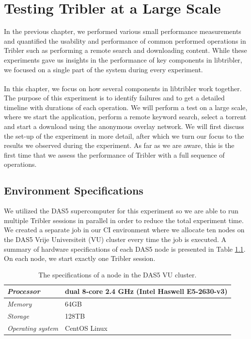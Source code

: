 \chapter{Testing Tribler at a Large Scale}
\label{chapter:large-scale-experiment}
In the previous chapter, we performed various small performance measurements and quantified the usability and performance of common performed operations in Tribler such as performing a remote search and downloading content. While these experiments gave us insights in the performance of key components in libtribler, we focused on a single part of the system during every experiment.\\\\
In this chapter, we focus on how several components in libtribler work together. The purpose of this experiment is to identify failures and to get a detailed timeline with durations of each operation. We will perform a test on a large scale, where we start the application, perform a remote keyword search, select a torrent and start a download using the anonymous overlay network. We will first discuss the set-up of the experiment in more detail, after which we turn our focus to the results we observed during the experiment. As far as we are aware, this is the first time that we assess the performance of Tribler with a full sequence of operations.

\section{Environment Specifications}
We utilized the DAS5 supercomputer for this experiment so we are able to run multiple Tribler sessions in parallel in order to reduce the total experiment time. We created a separate job in our CI environment where we allocate ten nodes on the DAS5 Vrije Universiteit (VU) cluster every time the job is executed. A summary of hardware specifications of each DAS5 node is presented in Table \ref{table:das5-node-specifications}. On each node, we start exactly one Tribler session.

\begin{table}[h!]
	\centering
	\begin{tabular}{|l|l|}
		\hline
		\emph{Processor} & dual 8-core 2.4 GHz (Intel Haswell E5-2630-v3)\\ \hline
		\emph{Memory} & 64GB \\ \hline
		\emph{Storage} & 128TB \\ \hline
		\emph{Operating system} & CentOS Linux \\ \hline
	\end{tabular}
	\caption{The specifications of a node in the DAS5 VU cluster.}
	\label{table:das5-node-specifications}
\end{table}


